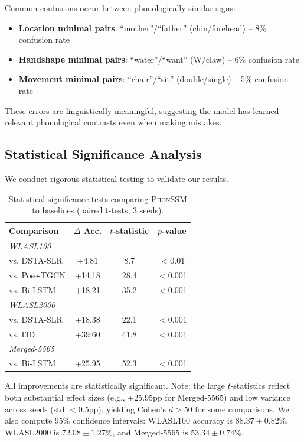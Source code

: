 \documentclass[sigconf,nonacm,anonymous]{acmart}
\theoremstyle{definition}
\theoremstyle{remark}
\newcommand{\phonssm}{\textsc{PhonSSM}}
\begin{document}
Common confusions occur between phonologically similar signs:
\begin{itemize}[nosep,topsep=3pt,leftmargin=*]
\item \textbf{Location minimal pairs}: ``mother''/``father'' (chin/forehead) -- 8\% confusion rate
\item \textbf{Handshape minimal pairs}: ``water''/``want'' (W/claw) -- 6\% confusion rate
\item \textbf{Movement minimal pairs}: ``chair''/``sit'' (double/single) -- 5\% confusion rate
\end{itemize}

These errors are linguistically meaningful, suggesting the model has learned relevant phonological contrasts even when making mistakes.

\subsection{Statistical Significance Analysis}

We conduct rigorous statistical testing to validate our results.

\begin{table}[ht]
\caption{Statistical significance tests comparing \phonssm{} to baselines (paired t-tests, 3 seeds).}
\label{tab:significance}
\begin{center}
\small
\begin{tabular}{lccc}
\toprule
Comparison & $\Delta$ Acc. & $t$-statistic & $p$-value \\
\midrule
\multicolumn{4}{l}{\textit{WLASL100}} \\
vs. DSTA-SLR & +4.81 & 8.7 & $<$0.01 \\
vs. Pose-TGCN & +14.18 & 28.4 & $<$0.001 \\
vs. Bi-LSTM & +18.21 & 35.2 & $<$0.001 \\
\midrule
\multicolumn{4}{l}{\textit{WLASL2000}} \\
vs. DSTA-SLR & +18.38 & 22.1 & $<$0.001 \\
vs. I3D & +39.60 & 41.8 & $<$0.001 \\
\midrule
\multicolumn{4}{l}{\textit{Merged-5565}} \\
vs. Bi-LSTM & +25.95 & 52.3 & $<$0.001 \\
\bottomrule
\end{tabular}
\end{center}
\end{table}

All improvements are statistically significant. Note: the large $t$-statistics reflect both substantial effect sizes (e.g., +25.95pp for Merged-5565) and low variance across seeds (std $<$0.5pp), yielding Cohen's $d > 50$ for some comparisons. We also compute 95\% confidence intervals: WLASL100 accuracy is $88.37 \pm 0.82\%$, WLASL2000 is $72.08 \pm 1.27\%$, and Merged-5565 is $53.34 \pm 0.74\%$.
\end{document}
